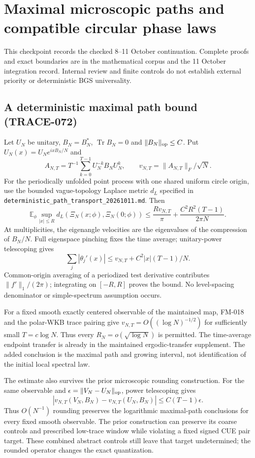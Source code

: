 \section{Maximal microscopic paths and compatible circular phase laws}
\label{sec:chat-research-20261011}
This checkpoint records the checked 8--11 October continuation. Complete
proofs and exact boundaries are in the mathematical corpus and the
11 October integration record. Internal review and finite
controls do not establish external priority or deterministic BGS universality.

\subsection{A deterministic maximal path bound (TRACE-072)}
Let $U_N$ be unitary, $B_N=B_N^*$, $\operatorname{Tr}B_N=0$ and
$\|B_N\|_{\rm op}\le C$. Put $U_N(x)=U_Ne^{ixB_N/N}$ and
\[
 A_{N,T}=T^{-1}\sum_{k=0}^{T-1}U_N^{-k}B_NU_N^k,
 \qquad v_{N,T}=\|A_{N,T}\|_F/\sqrt N.
\]
For the periodically unfolded point process with one shared uniform circle
origin, use the bounded vague-topology Laplace metric $d_L$ specified in
\texttt{deterministic\_path\_transport\_20261011.md}. Then
\[
 \mathbb E_\phi\sup_{|x|\le R}
 d_L(\Xi_N(x;\phi),\Xi_N(0;\phi))
 \le \frac{R v_{N,T}}\pi+
 \frac{C^2R^2(T-1)}{2\pi N}.
\]
At multiplicities, the eigenangle velocities are the eigenvalues of the
compression of $B_N/N$. Full eigenspace pinching fixes the time average;
unitary-power telescoping gives
\[
 \sum_j|\theta_j'(x)|\le v_{N,T}+C^2|x|(T-1)/N.
\]
Common-origin averaging of a periodized test derivative contributes
$\|f'\|_1/(2\pi)$; integrating on $[-R,R]$ proves the bound. No level-spacing
denominator or simple-spectrum assumption occurs.

For a fixed smooth exactly centered observable of the maintained map,
FM-018 and the polar-WKB trace pairing give
$v_{N,T}=O((\log N)^{-1/2})$ for sufficiently small $T=c\log N$.
Thus every $R_N=o(\sqrt{\log N})$ is permitted. The time-average endpoint
transfer is already in the maintained ergodic-transfer supplement. The added
conclusion is the maximal path and growing interval, not identification of
the initial local spectral law.

The estimate also survives the prior microscopic rounding construction.
For the same observable and $\epsilon=\|V_N-U_N\|_{\rm op}$,
power telescoping gives
\[
 |v_{N,T}(V_N,B_N)-v_{N,T}(U_N,B_N)|\le C(T-1)\epsilon.
\]
Thus $O(N^{-1})$ rounding preserves the logarithmic maximal-path conclusions
for every fixed smooth observable. The prior construction can preserve its
coarse controls and prescribed low-trace window while violating a fixed
signed CUE pair target. These combined abstract controls still leave that
target undetermined; the rounded operator changes the exact quantization.

